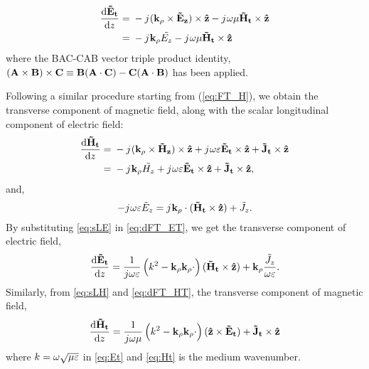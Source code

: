 \documentclass[12pt]{article}
\begin{document}
%
\begin{equation}
  \begin{split}
    \dv{\v{\ti{E}_t}}{z} ={}& -\j (\v{k_{\p}} \x \v{\ti{E}_z}) \x \v{\^{z}}
    -\j \O \u \v{\ti{H}_t} \x \v{\^{z}}\\
    ={}& -\j \v{k_{\p}} \ti{{E}_z} -\j \O \u \v{\ti{H}_t} \x \v{\^{z}}
  \end{split}
  \label{eq:dFT_ET}%
\end{equation}
%
where the BAC-CAB vector triple product identity, $(\mathbf{A} \times \mathbf{B})\times\mathbf{C} \equiv \mathbf{B}(\mathbf{A} \cdot \mathbf{C}) - \mathbf{C}(\mathbf{A} \cdot \mathbf{B})$ has been applied.

Following a similar procedure starting from (\ref{eq:FT_H}), we obtain the transverse component of magnetic field, along with the scalar longitudinal component of electric field:
%
\begin{equation}
  \begin{split}
    \dv{\v{\ti{H}_t}}{z} ={}& -\j (\v{k_{\p}} \x \v{\ti{H}_z}) \x \v{\^{z}}
    + \j \O \E \v{\ti{E}_t} \x \v{\^{z}} +
    \v{\ti{J}_t} \x \v{\^{z}} \\
    ={}& -\j \v{k_{\p}} \ti{{H}_z} + \j \O \E \v{\ti{E}_t} \x \v{\^{z}}  +
    \v{\ti{J}_t} \x \v{\^{z}},
  \end{split}
  \label{eq:dFT_HT}%
\end{equation}
%
and,
\begin{equation}
  -j\mkern1mu \omega \varepsilon \tilde{E}_z =
  j\mkern1mu \mathbf{k_{\rho}} \cdot (\mathbf{\tilde{H}_t} \times \mathbf{\hat{z}}) + {\tilde{J}_z}.
  \label{eq:sLE}
\end{equation}
%
By substituting \eqref{eq:sLE} in \eqref{eq:dFT_ET}, we get the transverse component of electric field,
%
\begin{equation}
  \dv{\mathbf{\tilde{E}_t}}{z} =
  \frac{1}{j \omega \varepsilon} \left( k^2 - \mathbf{k_{\rho}}\mathbf{k_{\rho}} \cdot \right) (\mathbf{\tilde{H}_t} \times \mathbf{\hat{z}}) + \mathbf{k_{\rho}} \frac{\tilde{J}_z}{\omega \varepsilon}.
  \label{eq:Et}
\end{equation}
%
Similarly, from \eqref{eq:sLH} and \eqref{eq:dFT_HT}, the transverse component of magnetic field,
%
\begin{equation}
  \dv{\mathbf{\tilde{H}_t}}{z} =
  \frac{1}{j \omega \mu} \left( k^2 - \mathbf{k_{\rho}}\mathbf{k_{\rho}} \cdot \right) (\mathbf{\hat{z}} \times \mathbf{\tilde{E}_t}) + \mathbf{\tilde{J}_t}
  \times \mathbf{\hat{z}}
  \label{eq:Ht}
\end{equation}
%
where $k = \omega \sqrt{\mu \varepsilon}$ in \eqref{eq:Et} and \eqref{eq:Ht} is the medium wavenumber.
\end{document}
